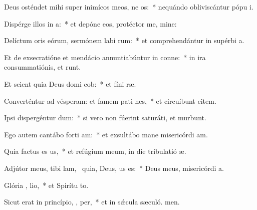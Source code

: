 \item Deus osténdet mihi super inimícos meos, ne  os:~* nequándo obliviscántur pópu i.
\item Dispérge illos in  a:~* et depóne eos, protéctor me, mine:
\item Delíctum oris eórum, sermónem labi rum:~* et comprehendántur in supérbi a.
\item Et de exsecratióne et mendácio annuntiabúntur in conne:~* in ira consummatiónis, et  runt.
\item Et scient quia Deus domi cob:~* et fíni ræ.
\item Converténtur ad vésperam: et famem pati  nes,~* et circuíbunt citem.
\item Ipsi dispergéntur  dum:~* si vero non fúerint saturáti, et murbunt.
\item Ego autem cantábo forti am:~* et exsultábo mane misericórdi am.
\item Quia factus es  us,~* et refúgium meum, in die tribulatió æ.
\item Adjútor meus, tibi lam,~\pscross{} quia, Deus,  us es:~* Deus meus, misericórdi a.
\item Glória ,  lio,~* et Spirítu to.
\item Sicut erat in princípio,  ,  per,~* et in sǽcula sæculó. men.
